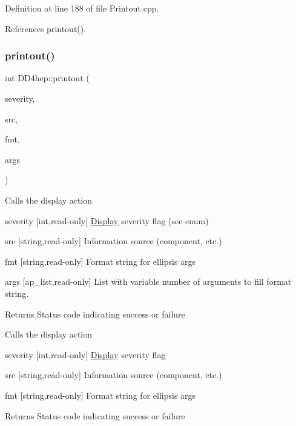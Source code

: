Definition at line 188 of file Printout.\+cpp.



References printout().

\hypertarget{namespace_d_d4hep_a1ad7a8f6ac790c5d06c8dc2e2c9bf656}{}\label{namespace_d_d4hep_a1ad7a8f6ac790c5d06c8dc2e2c9bf656} 
\subsubsection{\texorpdfstring{printout()}{printout()}\hspace{0.1cm}{\footnotesize\ttfamily [8/8]}}
{\footnotesize\ttfamily int D\+D4hep\+::printout (\begin{DoxyParamCaption}\item[{\hyperlink{namespace_d_d4hep_a5b5a64d56252469451f2020a27d57d42}{Print\+Level}}]{severity,  }\item[{const char $\ast$}]{src,  }\item[{const std\+::string \&}]{fmt,  }\item[{va\+\_\+list \&}]{args }\end{DoxyParamCaption})}

Calls the display action \begin{DoxyItemize}
\item severity \mbox{[}int,read-\/only\mbox{]} \hyperlink{class_d_d4hep_1_1_display}{Display} severity flag (see enum) \item src \mbox{[}string,read-\/only\mbox{]} Information source (component, etc.) \item fmt \mbox{[}string,read-\/only\mbox{]} Format string for ellipsis args \item args \mbox{[}ap\+\_\+list,read-\/only\mbox{]} List with variable number of arguments to fill format string. \begin{DoxyReturn}{Returns}
Status code indicating success or failure
\end{DoxyReturn}
Calls the display action \item severity \mbox{[}int,read-\/only\mbox{]} \hyperlink{class_d_d4hep_1_1_display}{Display} severity flag \item src \mbox{[}string,read-\/only\mbox{]} Information source (component, etc.) \item fmt \mbox{[}string,read-\/only\mbox{]} Format string for ellipsis args \begin{DoxyReturn}{Returns}
Status code indicating success or failure 
\end{DoxyReturn}
\end{DoxyItemize}


